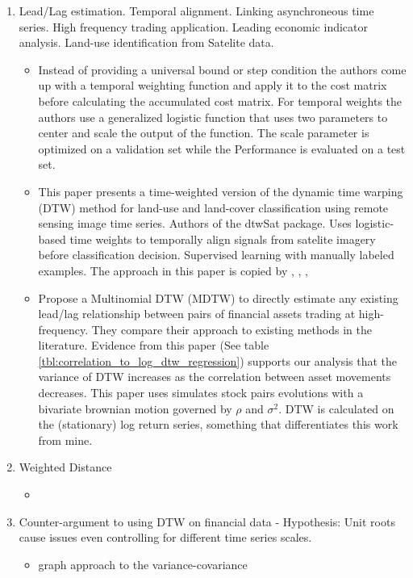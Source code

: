 \documentclass[12pt]{article}
\begin{document}
\begin{enumerate}
\begin{itemize}
    \end{itemize}
    \item Lead/Lag estimation. Temporal alignment. Linking asynchroneous time series. High frequency trading application. Leading economic indicator analysis. Land-use identification from Satelite data.
    \begin{itemize}
        \item \parencite{JEONG20112231} Instead of providing a universal bound or step condition the authors come up with a temporal weighting function and apply it to the cost matrix before calculating the accumulated cost matrix. For temporal weights the authors use a generalized logistic function that uses two parameters to center and scale the output of the function. The scale parameter is optimized on a validation set while the Performance is evaluated on a test set.
        \item \parencite{Maus_et_al_2016} This paper presents a time-weighted version of the dynamic time warping (DTW) method for land-use and land-cover classification using remote sensing image time series. Authors of the dtwSat package. Uses logistic-based time weights to temporally align signals from satelite imagery before classification decision. Supervised learning with manually labeled examples. The approach in this paper is copied by \parencite{Chaves_et_all_2021_Brazil_Crop_id}, \parencite{XiaoXingyuan2023LCCU}, \parencite{NarinO.G.2022URAN}, \parencite{QuXuzhou2023Mmls}
        \item \parencite{Ito_Sakemoto_2020} Propose a Multinomial DTW (MDTW) to directly estimate any existing lead/lag relationship between pairs of financial assets trading at high-frequency. They compare their approach to existing methods in the literature. Evidence from this paper (See table \ref{tbl:correlation_to_log_dtw_regression}) supports our analysis that the variance of DTW increases as the correlation between asset movements decreases. This paper uses simulates stock pairs evolutions with a bivariate brownian motion governed by $\rho$ and $\sigma^{2}$. DTW is calculated on the (stationary) log return series, something that differentiates this work from mine. 
    \end{itemize}
    \item Weighted Distance
    \begin{itemize}
        \item \parencite{JEONG20112231}
    \end{itemize}
    \item Counter-argument to using DTW on financial data - Hypothesis: Unit roots cause issues even controlling for different time series scales.
    \begin{itemize}
        \item \parencite{9145837_Entropic_DTW_Fin_Networks} graph approach to the variance-covariance 
    \end{itemize}
\end{enumerate}
\end{document}
